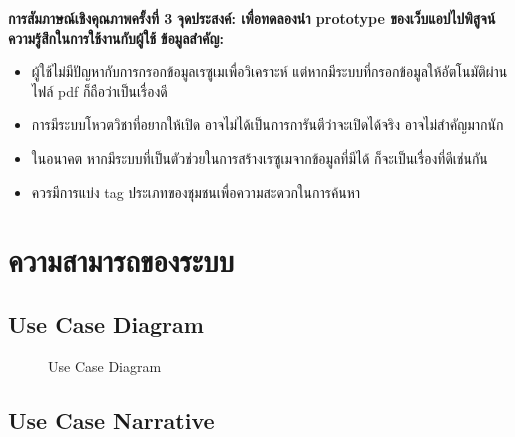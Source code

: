 \noindent\textbf{การสัมภาษณ์เชิงคุณภาพครั้งที่ 3}
\newline
\textbf{จุดประสงค์: เพื่อทดลองนำ prototype ของเว็บแอปไปพิสูจน์ความรู้สึกในการใช้งานกับผู้ใช้}
\newline
\textbf{ข้อมูลสำคัญ:}
\begin{itemize}
    \item ผู้ใช้ไม่มีปัญหากับการกรอกข้อมูลเรซูเมเพื่อวิเคราะห์ แต่หากมีระบบที่กรอกข้อมูลให้อัตโนมัติผ่านไฟล์ pdf ก็ถือว่าเป็นเรื่องดี
    \item การมีระบบโหวตวิชาที่อยากให้เปิด อาจไม่ได้เป็นการการันตีว่าจะเปิดได้จริง อาจไม่สำคัญมากนัก
    \item ในอนาคต หากมีระบบที่เป็นตัวช่วยในการสร้างเรซูเมจากข้อมูลที่มีได้ ก็จะเป็นเรื่องที่ดีเช่นกัน
    \item ควรมีการแบ่ง tag ประเภทของชุมชนเพื่อความสะดวกในการค้นหา
\end{itemize}


\section{ความสามารถของระบบ}
\subsection{Use Case Diagram}
\begin{figure}[H]\centering
    \setlength{\fboxrule}{0.2mm} %
    \setlength{\fboxsep}{0.5cm}
    \caption{Use Case Diagram}\label{fig:usecase}
\end{figure}
\subsection{Use Case Narrative}
